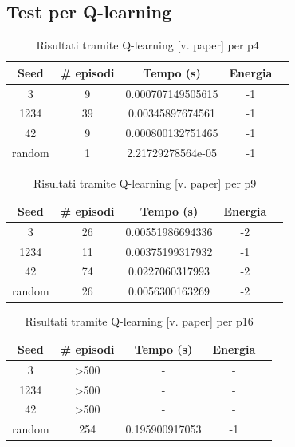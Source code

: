 \documentclass[conference]{IEEEtran}
\begin{document}
\subsection{Test per Q-learning}

\begin{table}[H]
\begin{center}
\begin{tabular}{|c|c|c|c|c|}
\hline
\textbf{Seed} & \textbf{\# episodi} & \textbf{Tempo (s)} & \textbf{Energia} \\ \hline
3 & 9 & 0.000707149505615 & -1 \\ \hline
1234 & 39 & 0.00345897674561 & -1 \\ \hline
42 & 9 & 0.000800132751465 & -1 \\ \hline
random & 1 & 2.21729278564e-05 & -1 \\ \hline
\end{tabular}
\end{center}
\caption{Risultati tramite Q-learning [v. paper] per p4}
\end{table}

\begin{table}[H]
\begin{center}
\begin{tabular}{|c|c|c|c|c|}
\hline
\textbf{Seed} & \textbf{\# episodi} & \textbf{Tempo (s)} & \textbf{Energia} \\ \hline
3 & 26 & 0.00551986694336 & -2 \\ \hline
1234 & 11 & 0.00375199317932 & -1 \\ \hline
42 & 74 & 0.0227060317993 & -2 \\ \hline
random & 26 & 0.0056300163269 & -2 \\ \hline
\end{tabular}
\end{center}
\caption{Risultati tramite Q-learning [v. paper] per p9}
\end{table}

\begin{table}[H]
\begin{center}
\begin{tabular}{|c|c|c|c|c|}
\hline
\textbf{Seed} & \textbf{\# episodi} & \textbf{Tempo (s)} & \textbf{Energia} \\ \hline
3 & >500 & - & - \\ \hline
1234 & >500 & - & - \\ \hline
42 & >500 & - & - \\ \hline
random & 254 & 0.195900917053 & -1 \\ \hline
\end{tabular}
\end{center}
\caption{Risultati tramite Q-learning [v. paper] per p16}
\end{table}
\end{document}
